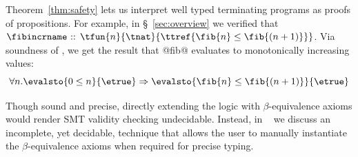Theorem~\ref{thm:safety} lets us interpret well typed terminating programs as proofs of
propositions.
%
For example, in \S~\ref{sec:overview} we verified that
%
$\fibincrname\text{ :: }{\tfun{n}{\tnat}{\ttref{\fib{n} \leq \fib{(n+1)}}}}$.
%
Via soundness of \corelan, we get the result that @fib@ evaluates to
monotonically increasing values:
$$
\forall n. \evalsto{0 \leq n}{\etrue} \Rightarrow \evalsto{\fib{n} \leq \fib{(n+1)}}{\etrue}
$$

%
Though sound and precise, directly extending the logic with $\beta$-equivalence axioms
would render SMT validity checking undecidable.
%
Instead, in ~\citep{appendix} we discuss an incomplete,
yet decidable, technique that allows the
user to manually instantiate the $\beta$-equivalence axioms
when required for precise typing.
